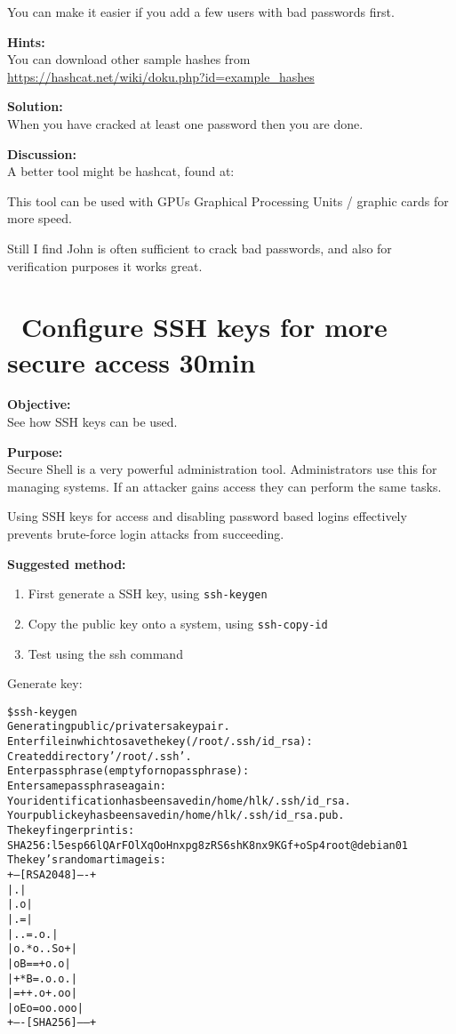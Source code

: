\documentclass[a4paper,11pt,notitlepage]{report}
\begin{document}
You can make it easier if you add a few users with bad passwords first.

{\bf Hints:}\\
You can download other sample hashes from\\
 \url{https://hashcat.net/wiki/doku.php?id=example_hashes}



{\bf Solution:}\\
When you have cracked at least one password then you are done.

{\bf Discussion:}\\
A better tool might be hashcat, found at:\\

This tool can be used with GPUs Graphical Processing Units / graphic cards for more speed.

Still I find John is often sufficient to crack bad passwords, and also for verification purposes it works great.


\chapter{\faInfoCircle\ Configure SSH keys for more secure access 30min}
\label{ex:config-ssh-keys}


{\bf Objective:}\\
See how SSH keys can be used.

{\bf Purpose:}\\
Secure Shell is a very powerful administration tool. Administrators use this for managing systems. If an attacker gains access they can perform the same tasks.

Using SSH keys for access and disabling password based logins effectively prevents brute-force login attacks from succeeding.

{\bf Suggested method:}\\

\begin{enumerate}
\item First generate a SSH key, using \verb+ssh-keygen+
\item Copy the public key onto a system, using \verb+ssh-copy-id+
\item Test using the ssh command
\end{enumerate}

Generate key:
\begin{alltt}\footnotesize
\$ ssh-keygen
Generating public/private rsa key pair.
Enter file in which to save the key (/root/.ssh/id_rsa):
Created directory '/root/.ssh'.
Enter passphrase (empty for no passphrase):
Enter same passphrase again:
Your identification has been saved in /home/hlk/.ssh/id_rsa.
Your public key has been saved in /home/hlk/.ssh/id_rsa.pub.
The key fingerprint is:
SHA256:l5esp66lQArFOlXqOoHnxpg8zRS6shK8nx9KGf+oSp4 root@debian01
The key's randomart image is:
+---[RSA 2048]----+
|      .          |
|   . o           |
|   .=            |
| ..=.      o .   |
|o.*o. . S o +    |
|oB==+o   . o     |
|+*B=.o.   o .    |
|=++.o +. o o     |
|oEo=oo .ooo      |
+----[SHA256]-----+
\end{alltt}
\end{document}
